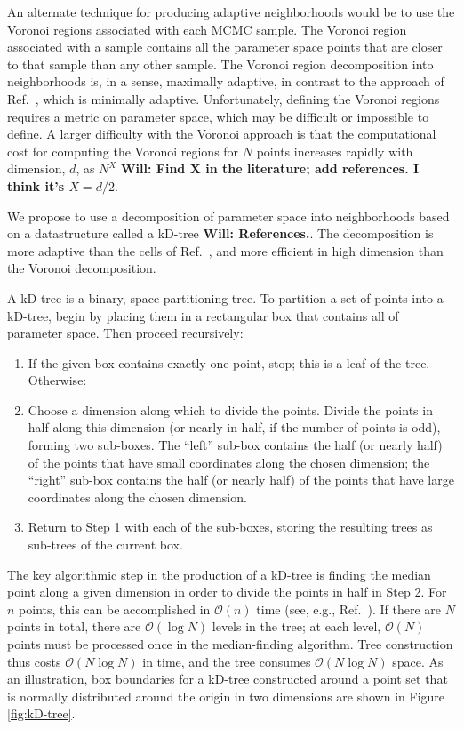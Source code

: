 \documentclass[prd,preprint]{revtex4}
\newcommand{\will}[1]{{\color{blue} \bf Will: #1}}
\newcommand{\order}[1]{\mathcal{O}\left( #1 \right)}
\begin{document}
An alternate technique for producing adaptive neighborhoods would be
to use the Voronoi regions associated with each MCMC sample.  The
Voronoi region associated with a sample contains all the parameter
space points that are closer to that sample than any other sample.
The Voronoi region decomposition into neighborhoods is, in a sense,
maximally adaptive, in contrast to the approach of
Ref.~\cite{Littenberg2009}, which is minimally adaptive.
Unfortunately, defining the Voronoi regions requires a metric on
parameter space, which may be difficult or impossible to define.  A
larger difficulty with the Voronoi approach is that the computational
cost for computing the Voronoi regions for $N$ points increases
rapidly with dimension, $d$, as $N^X$ \will{Find X in the literature;
  add references.  I think it's $X = d/2$}.

We propose to use a decomposition of parameter space into
neighborhoods based on a datastructure called a kD-tree
\will{References.}.  The decomposition is more adaptive than the cells
of Ref.~\cite{Littenberg2009}, and more efficient in high dimension
than the Voronoi decomposition.  

A kD-tree is a binary, space-partitioning tree.  To partition a set of
points into a kD-tree, begin by placing them in a rectangular box that
contains all of parameter space.  Then proceed recursively:
\begin{enumerate}
\item If the given box contains exactly one point, stop; this is a
  leaf of the tree.  Otherwise:
\item Choose a dimension along which to divide the points.  Divide the
  points in half along this dimension (or nearly in half, if the
  number of points is odd), forming two sub-boxes.  The ``left''
  sub-box contains the half (or nearly half) of the points that have
  small coordinates along the chosen dimension; the ``right'' sub-box
  contains the half (or nearly half) of the points that have large
  coordinates along the chosen dimension.
\item Return to Step 1 with each of the sub-boxes, storing the
  resulting trees as sub-trees of the current box.
\end{enumerate}
The key algorithmic step in the production of a kD-tree is finding the
median point along a given dimension in order to divide the points in
half in Step 2.  For $n$ points, this can be accomplished in
$\order{n}$ time (see, e.g., Ref.~\cite{Press2007}).  If there are $N$
points in total, there are $\order{\log N}$ levels in the tree; at
each level, $\order{N}$ points must be processed once in the
median-finding algorithm.  Tree construction thus costs $\order{N \log
  N}$ in time, and the tree consumes $\order{N \log N}$ space.  As an illustration, box
boundaries for a kD-tree constructed around a point set that is
normally distributed around the origin in two dimensions are shown in
Figure \ref{fig:kD-tree}.
\end{document}
